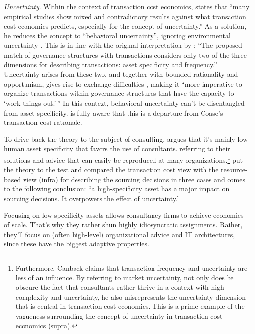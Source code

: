 \documentclass[12pt]{article}
\begin{document}
\emph{Uncertainty}. Within the context of transaction cost economics,
\citet[38]{shin2003} states that ``many empirical studies show mixed and
contradictory results against what transaction cost economics predicts,
especially for the concept of uncertainty.'' As a solution, he reduces
the concept to ``behavioral uncertainty'', ignoring environmental
uncertainty \citep[ 391-392]{watjatrakul2005}. This is in line with the
original interpretation by \citet[79]{williamson1985}: ``The proposed
match of governance structures with transactions considers only two of
the three dimensions for describing transactions: asset specificity and
frequency.'' Uncertainty arises from these two, and together with
bounded rationality and opportunism, gives rise to exchange difficulties
\citep[ 7]{williamson1975}, making it ``more imperative to organize
transactions within governance structures that have the capacity to
`work things out.'\,'' \citep[ 79]{williamson1985} In this context,
behavioral uncertainty can't be disentangled from asset specificity.
\citet[78]{williamson1985} is fully aware that this is a departure from
Coase's transaction cost rationale.

To drive back the theory to the subject of consulting,
\citet[37]{canback1998} argues that it's mainly low human asset
specificity that favors the use of consultants, referring to their
solutions and advice that can easily be reproduced at many
organizations.\footnote{Furthermore, Canback claims that transaction
  frequency and uncertainty are less of an influence. By referring to
  market uncertainty, not only does he obscure the fact that consultants
  rather thrive in a context with high complexity and uncertainty, he
  also misrepresents the uncertainty dimension that is central in
  transaction cost economics. This is a prime example of the vagueness
  surrounding the concept of uncertainty in transaction cost economics
  (supra).} \citet[408]{watjatrakul2005} put the theory to the test and
compared the transaction cost view with the resource-based view (infra)
for describing the sourcing decisions in three cases and comes to the
following conclusion: ``a high-specificity asset has a major impact on
sourcing decisions. It overpowers the effect of uncertainty.''

Focusing on low-specificity assets allows consultancy firms to achieve
economies of scale. That's why they rather shun highly idiosyncratic
assignments. Rather, they'll focus on (often high-level) organizational
advice and IT architectures, since these have the biggest adaptive
properties.
\end{document}
